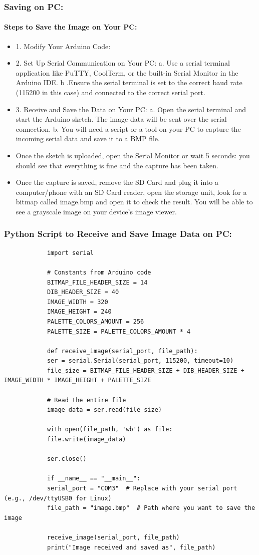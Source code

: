 \documentclass[10pt, a4paper]{beamer}
\begin{document}
	\begin{frame}		
		\frametitle{Saving on PC:}
		\framesubtitle{Steps to Save the Image on Your PC:}
		\begin{itemize}
			\item 1. Modify Your Arduino Code:
			\item 2. Set Up Serial Communication on Your PC:\newline
				a. Use a serial terminal application like PuTTY, CoolTerm, or the built-in Serial Monitor in the Arduino IDE.\newline
				b .Ensure the serial terminal is set to the correct baud rate (115200 in this case) and connected to the correct serial port.
			\item 3. Receive and Save the Data on Your PC:\newline
				a. Open the serial terminal and start the Arduino sketch. The image data will be sent over the serial connection.\newline
				b. You will need a script or a tool on your PC to capture the incoming serial data and save it to a BMP file.
			\item Once the sketch is uploaded, open the Serial Monitor or wait 5 seconds: you should see that everything is fine and the capture has been taken.
			\item Once the capture is saved, remove the SD Card and plug it into a computer/phone with an SD Card reader, open the storage unit, look for a bitmap called image.bmp and open it to check the result. You will be able to see a grayscale image on your device's image viewer. \newpage
		\end{itemize}
		
	\end{frame}
	
	\begin{frame}[fragile]
		\frametitle{Python Script to Receive and Save Image Data on PC:}
		\begin{lstlisting}
			import serial
			
			# Constants from Arduino code
			BITMAP_FILE_HEADER_SIZE = 14
			DIB_HEADER_SIZE = 40
			IMAGE_WIDTH = 320
			IMAGE_HEIGHT = 240
			PALETTE_COLORS_AMOUNT = 256
			PALETTE_SIZE = PALETTE_COLORS_AMOUNT * 4
			
			def receive_image(serial_port, file_path):
			ser = serial.Serial(serial_port, 115200, timeout=10)
			file_size = BITMAP_FILE_HEADER_SIZE + DIB_HEADER_SIZE + IMAGE_WIDTH * IMAGE_HEIGHT + PALETTE_SIZE
			
			# Read the entire file
			image_data = ser.read(file_size)
			
			with open(file_path, 'wb') as file:
			file.write(image_data)
			
			ser.close()
			
			if __name__ == "__main__":
			serial_port = "COM3"  # Replace with your serial port (e.g., /dev/ttyUSB0 for Linux)
			file_path = "image.bmp"  # Path where you want to save the image
			
			receive_image(serial_port, file_path)
			print("Image received and saved as", file_path)
			
			 
	\end{lstlisting}
	\end{frame}
	
\end{document}
